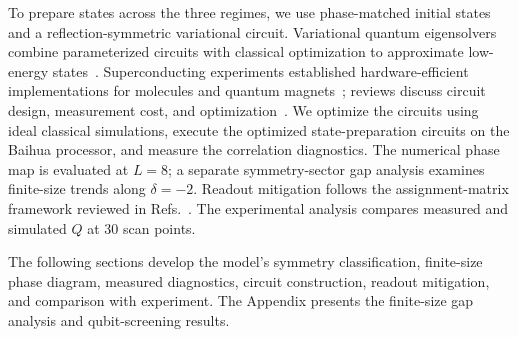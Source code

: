 To prepare states across the three regimes, we use phase-matched initial states and a reflection-symmetric variational circuit.
Variational quantum eigensolvers combine parameterized circuits with classical optimization to approximate low-energy states~\cite{peruzzo2014variational}.
Superconducting experiments established hardware-efficient implementations for molecules and quantum magnets~\cite{kandala2017hardware}; reviews discuss circuit design, measurement cost, and optimization~\cite{cerezo2021variational,tilly2022variational}.
We optimize the circuits using ideal classical simulations, execute the optimized state-preparation circuits on the Baihua processor, and measure the correlation diagnostics.
The numerical phase map is evaluated at $L=8$; a separate symmetry-sector gap analysis examines finite-size trends along $\delta=-2$.
Readout mitigation follows the assignment-matrix framework reviewed in Refs.~\cite{endo2021hybrid,cai2023quantum}.
The experimental analysis compares measured and simulated $Q$ at $30$ scan points.

The following sections develop the model's symmetry classification, finite-size phase diagram, measured diagnostics, circuit construction, readout mitigation, and comparison with experiment.
The Appendix presents the finite-size gap analysis and qubit-screening results.
